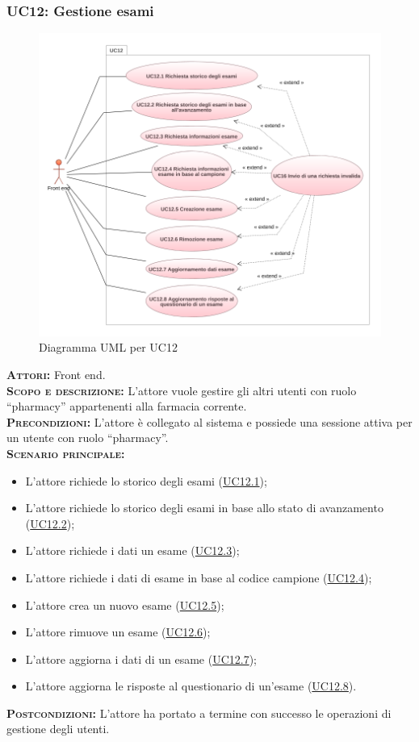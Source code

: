\subsubsection{UC12: Gestione esami}
\label{sec:UC12}
\begin{figure}[h!]
    \centering
    \includegraphics[width=\textwidth]{figures/uc/uc12.png}
    \caption[Diagramma UML per UC12]{Diagramma UML per UC12
    \label{fig:uc12}}
\end{figure}
\textsc{\textbf{Attori:}} Front end.\\
\textsc{\textbf{Scopo e descrizione:}} L'attore vuole gestire gli altri utenti con ruolo ``pharmacy'' appartenenti alla farmacia corrente.\\
\textsc{\textsc{\textbf{Precondizioni:}}} L'attore è collegato al sistema e possiede una sessione attiva per un utente con ruolo ``pharmacy''.\\
\textsc{\textbf{Scenario principale:}}
\begin{itemize}
    \item L'attore richiede lo storico degli esami (\hyperref[sec:UC121]{UC12.1});
    \item L'attore richiede lo storico degli esami in base allo stato di avanzamento (\hyperref[sec:UC122]{UC12.2});
    \item L'attore richiede i dati un esame (\hyperref[sec:UC123]{UC12.3});
    \item L'attore richiede i dati di esame in base al codice campione (\hyperref[sec:UC124]{UC12.4});
    \item L'attore crea un nuovo esame (\hyperref[sec:UC125]{UC12.5});
    \item L'attore rimuove un esame (\hyperref[sec:UC126]{UC12.6});
    \item L'attore aggiorna i dati di un esame (\hyperref[sec:UC127]{UC12.7});
    \item L'attore aggiorna le risposte al questionario di un'esame (\hyperref[sec:UC128]{UC12.8}).
\end{itemize}
\textsc{\textbf{Postcondizioni:}} L'attore ha portato a termine con successo le operazioni di gestione degli utenti.

